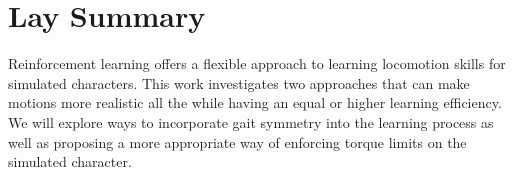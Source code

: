 

\chapter{Lay Summary}

Reinforcement learning offers a flexible approach to learning locomotion skills for simulated characters. This work investigates two approaches that can make motions more realistic all the while having an equal or higher learning efficiency. We will explore ways to incorporate gait symmetry into the learning process as well as proposing a more appropriate way of enforcing torque limits on the simulated character.



